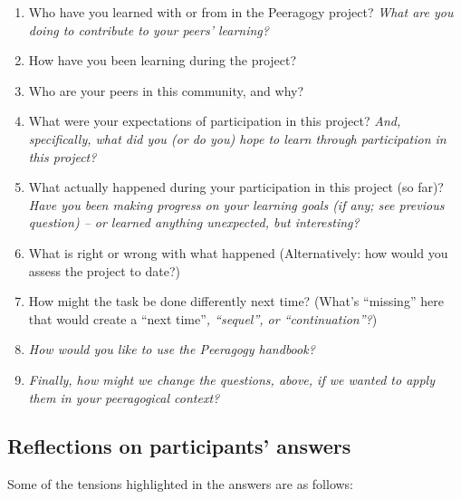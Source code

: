 \begin{enumerate}
\def\labelenumi{\arabic{enumi}.}
\item
  Who have you learned with or from in the Peeragogy project? \emph{What
  are you doing to contribute to your peers' learning?}
\item
  How have you been learning during the project?
\item
  Who are your peers in this community, and why?
\item
  What were your expectations of participation in this project?
  \emph{And, specifically, what did you (or do you) hope to learn
  through participation in this project?}
\item
  What actually happened during your participation in this project (so
  far)? \emph{Have you been making progress on your learning goals (if
  any; see previous question) -- or learned anything unexpected, but
  interesting?}
\item
  What is right or wrong with what happened (Alternatively: how would
  you assess the project to date?)
\item
  How might the task be done differently next time? (What's ``missing''
  here that would create a ``next time''\emph{, ``sequel'', or
  ``continuation''?})
\item
  \emph{How would you like to use the Peeragogy handbook?}
\item
  \emph{Finally, how might we change the questions, above, if we wanted
  to apply them in your peeragogical context?}
\end{enumerate}

\hypertarget{reflections-on-participants-answers}{%
\subsection{\texorpdfstring{\textbf{Reflections on participants'
answers}}{Reflections on participants' answers}}\label{reflections-on-participants-answers}}

Some of the tensions highlighted in the answers are as follows:

